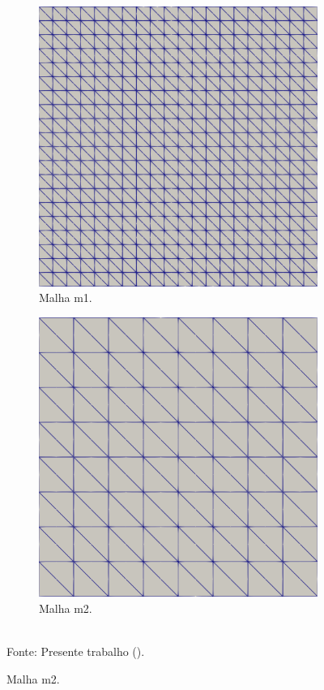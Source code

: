 \begin{figure}[h!]
    \centering
    \caption{Cavidade bidimensional - Malhas utilizadas para a análise de dependência.}
    \begin{subfigure}{0.49\textwidth}
        \centering
        \includegraphics[width=0.8\linewidth]{Figuras/Cavity/m2.png}
        \caption{Malha m1.}
    \end{subfigure}
    \begin{subfigure}{0.49\textwidth}
        \centering
        \includegraphics[width=0.8\linewidth]{Figuras/Cavity/m3.png}
        \caption{Malha m2.}
    \end{subfigure}
    \\Fonte: Presente trabalho (\the\year).
    \label{fig:cavity-mesh2}
\end{figure}

